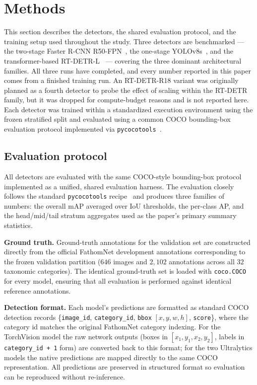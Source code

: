 \documentclass[11pt,a4paper,twocolumn]{article}
\begin{document}
\section{Methods}
\label{sec:methods}

This section describes the detectors, the shared evaluation protocol, and the
training setup used throughout the study. Three detectors are benchmarked ---
the two-stage Faster R-CNN R50-FPN~\cite{fasterrcnn2015}, the one-stage
YOLOv8s~\cite{yolov8_2023}, and the transformer-based RT-DETR-L~\cite{rtdetr2024}
--- covering the three dominant architectural families. All three runs have
completed, and every number reported in this paper comes from a finished
training run. An RT-DETR-R18 variant was originally planned as a fourth
detector to probe the effect of scaling within the RT-DETR family, but it was
dropped for compute-budget reasons and is not reported here. Each detector was trained within a standardized execution environment
using the frozen stratified split and evaluated using a common COCO
bounding-box evaluation protocol implemented via \texttt{pycocotools}~\cite{pycocotools}.

\subsection{Evaluation protocol}
\label{sec:eval}

All detectors are evaluated with the same COCO-style bounding-box protocol
implemented as a unified, shared evaluation harness. The evaluation
closely follows the standard \texttt{pycocotools} recipe~\cite{coco2014}
and produces three families of numbers: the overall mAP averaged over IoU
thresholds, the per-class AP, and the head/mid/tail stratum aggregates used as
the paper's primary summary statistics.

\textbf{Ground truth.} Ground-truth annotations for the validation set are constructed
directly from the official FathomNet development annotations corresponding to the
frozen validation partition ($646$ images and $2{,}102$ annotations across all
$32$ taxonomic categories). The identical ground-truth set is loaded with
\texttt{coco.COCO} for every model, ensuring that all evaluation is performed against
identical reference annotations.

\textbf{Detection format.} Each model's predictions are formatted as standard
COCO detection records
\{\texttt{image\_id}, \texttt{category\_id}, \texttt{bbox} $[x,y,w,h]$,
\texttt{score}\}, where the category id matches the original FathomNet category indexing.
For the TorchVision model the raw network outputs (boxes in
$[x_1,y_1,x_2,y_2]$, labels in \texttt{category\_id\,+\,1} form) are converted
back to this format; for the two Ultralytics models the native predictions
are mapped directly to the same COCO representation. All predictions are preserved
in structured format so evaluation can be reproduced without re-inference.
\end{document}
